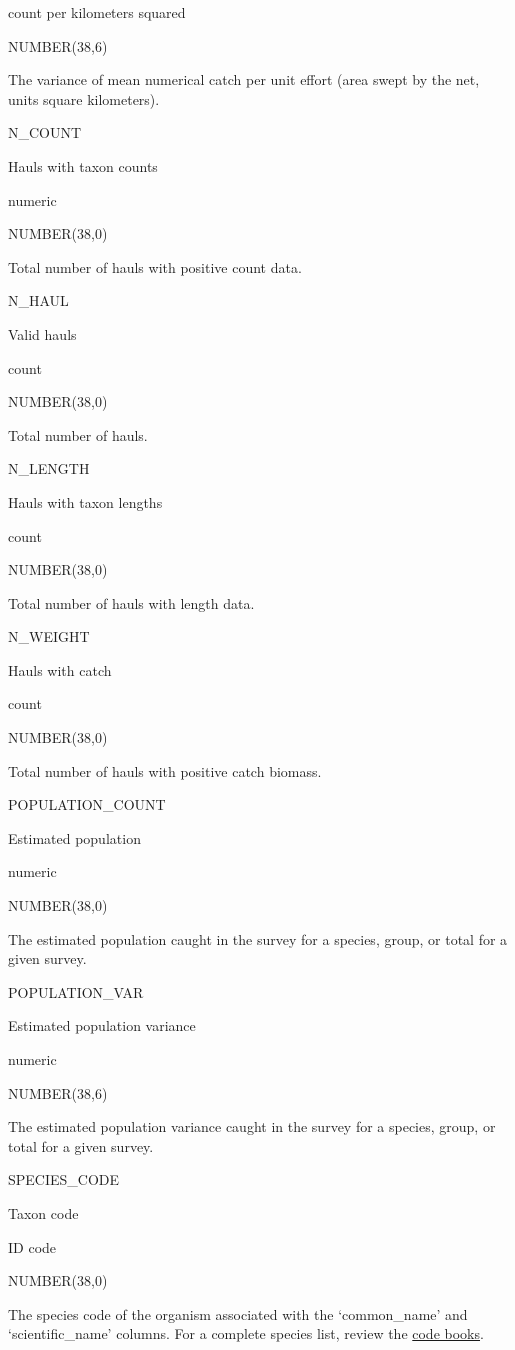 \documentclass[
  letterpaper,
  oneside,
  open=any]{scrbook}
\begin{document}
count per kilometers squared

NUMBER(38,6)

The variance of mean numerical catch per unit effort (area swept by the
net, units square kilometers).

N\_COUNT

Hauls with taxon counts

numeric

NUMBER(38,0)

Total number of hauls with positive count data.

N\_HAUL

Valid hauls

count

NUMBER(38,0)

Total number of hauls.

N\_LENGTH

Hauls with taxon lengths

count

NUMBER(38,0)

Total number of hauls with length data.

N\_WEIGHT

Hauls with catch

count

NUMBER(38,0)

Total number of hauls with positive catch biomass.

POPULATION\_COUNT

Estimated population

numeric

NUMBER(38,0)

The estimated population caught in the survey for a species, group, or
total for a given survey.

POPULATION\_VAR

Estimated population variance

numeric

NUMBER(38,6)

The estimated population variance caught in the survey for a species,
group, or total for a given survey.

SPECIES\_CODE

Taxon code

ID code

NUMBER(38,0)

The species code of the organism associated with the `common\_name' and
`scientific\_name' columns. For a complete species list, review the
\href{https://www.fisheries.noaa.gov/resource/document/groundfish-survey-species-code-manual-and-data-codes-manual}{code
books}.
\end{document}
